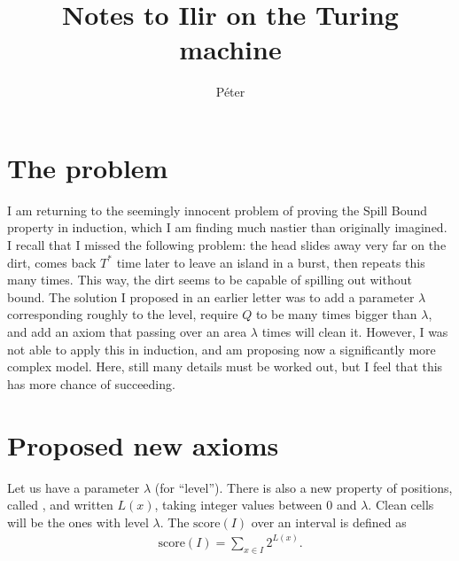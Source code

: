 \documentclass[12pt]{memoir}
\newcommand{\score}{\mathrm{score}}
\newcommand{\Tu}{T}
\begin{document}
\title{Notes to Ilir on the Turing machine}

\author{P\'eter}

\maketitle

\section{The problem}

I am returning to the seemingly innocent problem of proving the Spill Bound property
in induction, which I am finding much nastier than originally imagined.
I recall that I missed the following problem: 
the head slides away very far on the dirt, 
comes back \( \Tu^{*} \) time later to leave an island in a burst, 
then repeats this many times.
This way, the dirt seems to be capable of spilling out without bound.
The solution I proposed in an earlier letter was to add a parameter \( \lambda \)
corresponding roughly to the level, require \( Q \) to be many times bigger than \( \lambda \),
and add an axiom that passing over an area \( \lambda \) times will clean it.
However, I was not able to apply this in induction, and am proposing now a significantly
more complex model.
Here, still many details must be worked out, but I feel that this has more chance of succeeding.

\section{Proposed new axioms}

Let us have a parameter \( \lambda \) (for ``level'').
There is also a new property of positions, called , and written \( L(x) \),
taking integer values between 0 and \( \lambda \).
Clean cells will be the ones with level \( \lambda \).
The  \( \score(I) \) over an interval is defined as
 \begin{align}\label{eq:score}
  \score(I)=\sum_{x\in I}2^{L(x)}.
 \end{align}

\end{document}
